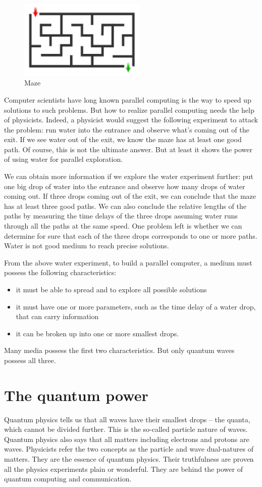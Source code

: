 \documentclass{book}
\begin{document}
\begin{figure}[ht]
\includegraphics[width=6cm]{pic/maze.png}
\caption{Maze}
\label{Maze}
\end{figure}

Computer scientists have long known parallel computing is the way to speed up solutions to such problems. But how to realize parallel computing needs the help of physicists. Indeed, a physicist would suggest the following experiment to attack the problem: run water into the entrance and observe what's coming out of the exit. If we see water out of the exit, we know the maze has at least one good path. Of course, this is not the ultimate answer. But at least it shows the power of using water for parallel exploration.

We can obtain more information if we explore the water experiment further: put one big drop of water into the entrance and observe how many drops of water coming out. If three drops coming out of the exit, we can conclude that the maze has at least three good paths. We can also conclude the relative lengths of the paths by measuring the time delays of the three drops assuming water runs through all the paths at the same speed. One problem left is whether we can determine for sure that each of the three drops corresponds to one or more paths. Water is not good medium to reach precise solutions.

From the above water experiment, to build a parallel computer, a medium must possess the following characteristics:
\begin{itemize}
    \item it must be able to spread and to explore all possible solutions
    \item it must have one or more parameters, such as the time delay of a water drop, that can carry information
    \item it can be broken up into one or more smallest drops.
\end{itemize}
Many media possess the first two characteristics. But only quantum waves possess all three.

\section{The quantum power}
Quantum physics tells us that all waves have their smallest drops -- the quanta, which cannot be divided further. This is the so-called particle nature of waves. Quantum physics also says that all matters including electrons and protons are waves. Physicists refer the two concepts as the particle and wave dual-natures of matters. They are the essence of quantum physics. Their truthfulness are proven all the physics experiments plain or wonderful. They are behind the power of quantum computing and communication.
\end{document}

